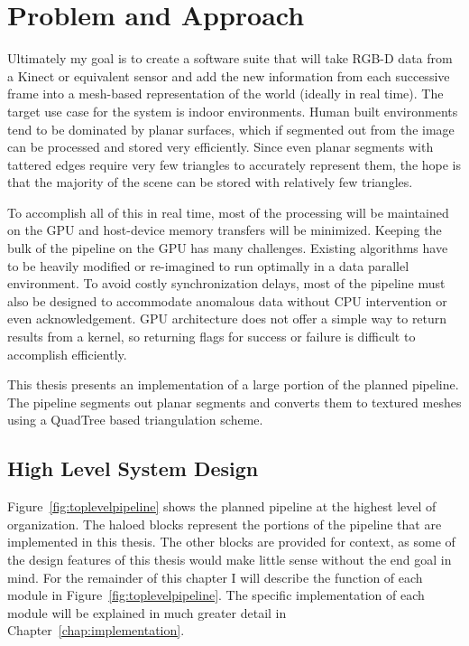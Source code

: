 \chapter{Problem and Approach}
\label{chap:approach}
Ultimately my goal is to create a software suite that will take RGB-D data from a Kinect or equivalent sensor and add the new information from each successive frame into a mesh-based representation of the world (ideally in real time). The target use case for the system is indoor environments. Human built environments tend to be dominated by planar surfaces, which if segmented out from the image can be processed and stored very efficiently. Since even planar segments with tattered edges require very few triangles to accurately represent them, the hope is that the majority of the scene can be stored with relatively few triangles.\par
To accomplish all of this in real time, most of the processing will be maintained on the GPU and host-device memory transfers will be minimized. Keeping the bulk of the pipeline on the GPU has many challenges. Existing algorithms have to be heavily modified or re-imagined to run optimally in a data parallel environment. To avoid costly synchronization delays, most of the pipeline must also be designed to accommodate anomalous data without CPU intervention or even acknowledgement. GPU architecture does not offer a simple way to return results from a kernel, so returning flags for success or failure is difficult to accomplish efficiently.\par

This thesis presents an implementation of a large portion of the planned pipeline. The pipeline segments out planar segments and converts them to textured meshes using a QuadTree based triangulation scheme.
\section{High Level System Design}
Figure~\ref{fig:toplevelpipeline} shows the planned pipeline at the highest level of organization. The haloed blocks represent the portions of the pipeline that are implemented in this thesis. The other blocks are provided for context, as some of the design features of this thesis would make little sense without the end goal in mind. For the remainder of this chapter I will describe the function of each module in Figure~\ref{fig:toplevelpipeline}. The specific implementation of each module will be explained in much greater detail in Chapter~\ref{chap:implementation}.


